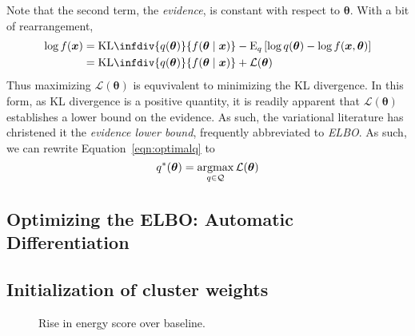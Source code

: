     Note that the second term, the \emph{evidence}, is constant with respect to 
    $\bm{\theta}$.  With a bit of rearrangement,
    \[
        \begin{aligned}
        \log f(\bm{x}) 
            &= \text{KL}\infdiv{q(\bm{\theta})}{f(\bm{\theta}\mid\bm{x})}
                - \text{E}_q\left[
                \log q(\bm{\theta}) - \log f(\bm{x},\bm{\theta})
                \right]\\
            &= \text{KL}\infdiv{q(\bm{\theta})}{f(\bm{\theta}\mid\bm{x})}
                + \mathcal{L}(\bm{\theta})
        \end{aligned}
    \]
    Thus maximizing $\mathcal{L}(\bm{\theta})$ is equvivalent to minimizing the 
    KL divergence. In this form, as KL divergence is a positive quantity, it is
    readily apparent that $\mathcal{L}(\bm{\theta})$ establishes a lower bound
    on the evidence.  As such, the variational literature has christened it the
    \emph{evidence lower bound}, frequently abbreviated to \emph{ELBO}.  As such,
    we can rewrite Equation~\eqref{eqn:optimalq} to
    \[
        q^*(\bm{\theta}) = \operatorname*{argmax}_{q\in\mathcal{Q}} \mathcal{L}(\bm{\theta})
    \]
    
\subsection{Optimizing the ELBO: Automatic Differentiation}




\subsection{Initialization of cluster weights}

\begin{figure}
    \caption{Rise in energy score over baseline.}
    
\end{figure}


